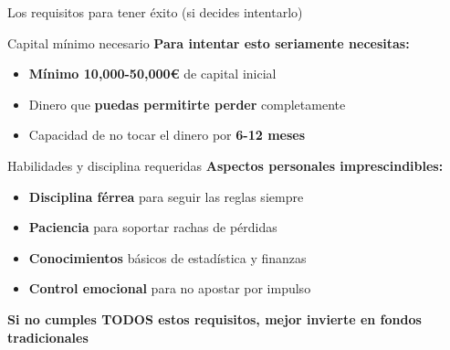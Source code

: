 \documentclass[aspectratio=169]{beamer}
\begin{document}
\begin{frame}{Los requisitos para tener éxito (si decides intentarlo)}
\begin{block}{Capital mínimo necesario}
\textbf{Para intentar esto seriamente necesitas:}
\begin{itemize}
\item \textcolor{azulprincipal}{\textbf{Mínimo 10,000-50,000€}} de capital inicial
\item Dinero que \textcolor{rojoperdida}{\textbf{puedas permitirte perder}} completamente
\item Capacidad de no tocar el dinero por \textbf{6-12 meses}
\end{itemize}
\end{block}

\begin{block}{Habilidades y disciplina requeridas}
\textbf{Aspectos personales imprescindibles:}
\begin{itemize}
\item \textcolor{verdeganancia}{\textbf{Disciplina férrea}} para seguir las reglas siempre
\item \textcolor{azulprincipal}{\textbf{Paciencia}} para soportar rachas de pérdidas
\item \textcolor{naranjaatencion}{\textbf{Conocimientos}} básicos de estadística y finanzas
\item \textcolor{rojoperdida}{\textbf{Control emocional}} para no apostar por impulso
\end{itemize}
\end{block}

\vspace{0.3cm}
\begin{center}
\textbf{Si no cumples TODOS estos requisitos, mejor invierte en fondos tradicionales}
\end{center}
\end{frame}
\end{document}
